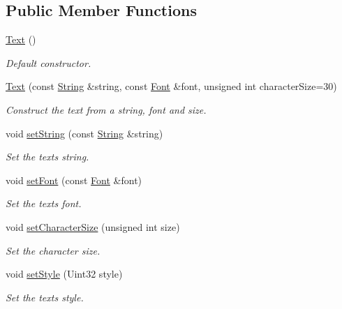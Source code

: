 \subsection*{Public Member Functions}
\begin{DoxyCompactItemize}
\item 
\hyperlink{classsf_1_1_text_aff7cab6a92e5948c9d1481cb2d87eb84}{Text} ()
\begin{DoxyCompactList}\small\item\em Default constructor. \end{DoxyCompactList}\item 
\hyperlink{classsf_1_1_text_a614019e0b5c0ed39a99d32483a51f2c5}{Text} (const \hyperlink{classsf_1_1_string}{String} \&string, const \hyperlink{classsf_1_1_font}{Font} \&font, unsigned int character\+Size=30)
\begin{DoxyCompactList}\small\item\em Construct the text from a string, font and size. \end{DoxyCompactList}\item 
void \hyperlink{classsf_1_1_text_a7d3b3359f286fd9503d1ced25b7b6c33}{set\+String} (const \hyperlink{classsf_1_1_string}{String} \&string)
\begin{DoxyCompactList}\small\item\em Set the text\textquotesingle{}s string. \end{DoxyCompactList}\item 
void \hyperlink{classsf_1_1_text_a2927805d1ae92d57f15034ea34756b81}{set\+Font} (const \hyperlink{classsf_1_1_font}{Font} \&font)
\begin{DoxyCompactList}\small\item\em Set the text\textquotesingle{}s font. \end{DoxyCompactList}\item 
void \hyperlink{classsf_1_1_text_ae96f835fc1bff858f8a23c5b01eaaf7e}{set\+Character\+Size} (unsigned int size)
\begin{DoxyCompactList}\small\item\em Set the character size. \end{DoxyCompactList}\item 
void \hyperlink{classsf_1_1_text_ad791702bc2d1b6590a1719aa60635edf}{set\+Style} (Uint32 style)
\begin{DoxyCompactList}\small\item\em Set the text\textquotesingle{}s style. \end{DoxyCompactList}\item 

\end{DoxyCompactItemize}
